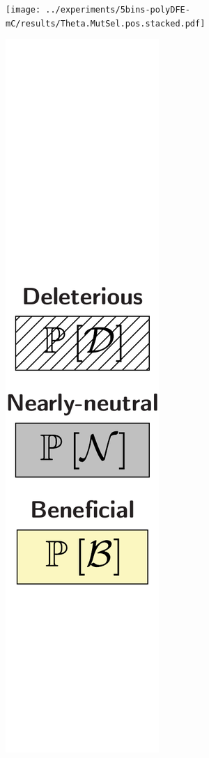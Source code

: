 \documentclass{article}
\begin{document}
\begin{center}
\begin{minipage}{0.09\linewidth}
        \end{minipage}
        \begin{minipage}{0.9\linewidth}
            \texttt{[image: ../experiments/5bins-polyDFE-mC/results/Theta.MutSel.pos.stacked.pdf]}
        \end{minipage}
        \begin{minipage}{0.09\linewidth}
            \includegraphics[width=\linewidth, page=1]{artworks/legend.polycat}
        \end{minipage}
    \end{center}
\end{document}
